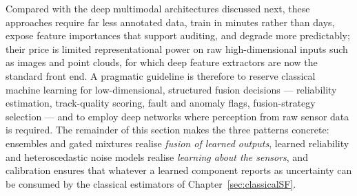 Compared with the deep multimodal architectures discussed next, these approaches require far less annotated data, train in minutes rather than days, expose feature importances that support auditing, and degrade more predictably; their price is limited representational power on raw high-dimensional inputs such as images and point clouds, for which deep feature extractors \cite{guo_deep_2019} are now the standard front end. A pragmatic guideline is therefore to reserve classical machine learning for low-dimensional, structured fusion decisions --- reliability estimation, track-quality scoring, fault and anomaly flags, fusion-strategy selection --- and to employ deep networks where perception from raw sensor data is required.
The remainder of this section makes the three patterns concrete: ensembles and gated mixtures realise \emph{fusion of learned outputs}, learned reliability and heteroscedastic noise models realise \emph{learning about the sensors}, and calibration ensures that whatever a learned component reports as uncertainty can be consumed by the classical estimators of Chapter~\ref{sec:classicalSF}.

